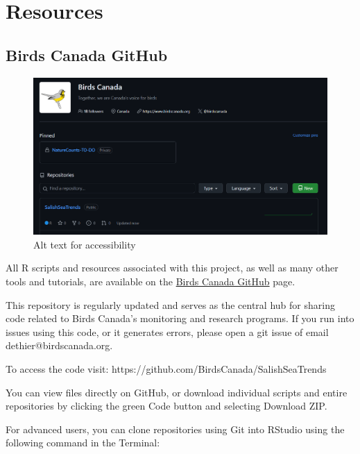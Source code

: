 \documentclass[
  letterpaper,
  DIV=11,
  numbers=noendperiod]{scrreprt}
\begin{document}

\chapter{Resources}\label{resources}

\section{Birds Canada GitHub}\label{9.9BirdsCan}

\begin{figure}[H]

{\centering \includegraphics{Images/BirdsCanadaGithub.png}

}

\caption{Alt text for accessibility}

\end{figure}%

All R scripts and resources associated with this project, as well as
many other tools and tutorials, are available on the
\href{https://github.com/BirdsCanada}{Birds Canada GitHub} page.

This repository is regularly updated and serves as the central hub for
sharing code related to Birds Canada's monitoring and research programs.
If you run into issues using this code, or it generates errors, please
open a git issue of email dethier@birdscanada.org.

To access the code visit: https://github.com/BirdsCanada/SalishSeaTrends

You can view files directly on GitHub, or download individual scripts
and entire repositories by clicking the green Code button and selecting
Download ZIP.

For advanced users, you can clone repositories using Git into RStudio
using the following command in the Terminal:
\end{document}
